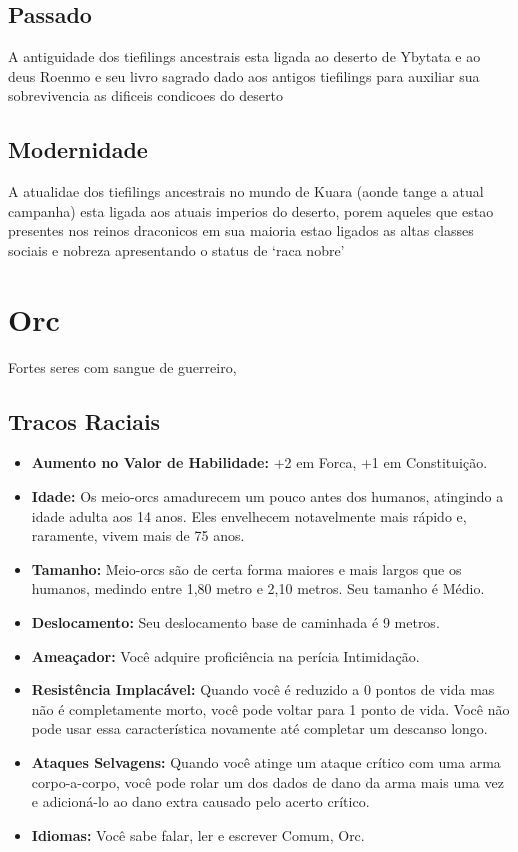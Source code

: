 \documentclass{book}
\begin{document}
\section{Passado}
A antiguidade dos tiefilings ancestrais esta ligada ao deserto de Ybytata e ao deus Roenmo 
e seu livro sagrado dado aos antigos tiefilings para auxiliar sua sobrevivencia as dificeis 
condicoes do deserto 
\section{Modernidade}
A atualidae dos tiefilings ancestrais no mundo de Kuara (aonde tange a atual campanha) esta 
ligada aos atuais imperios do deserto, porem aqueles que estao presentes nos reinos draconicos 
em sua maioria estao ligados as altas classes sociais e nobreza apresentando o status de `raca
nobre'

\chapter{Orc}
Fortes seres com sangue de guerreiro,
\section{Tracos Raciais}
\begin{itemize}
    \item \textbf{Aumento no Valor de Habilidade:} +2 em Forca, +1 em Constituição.
    \item \textbf{Idade:} Os meio-orcs amadurecem um pouco antes dos humanos, atingindo a 
         idade adulta aos 14 anos. Eles envelhecem notavelmente mais rápido e, raramente,
         vivem mais de 75 anos.
    \item \textbf{Tamanho:} Meio-orcs são de certa forma maiores e mais largos que os 
          humanos, medindo entre 1,80 metro e 2,10 metros. Seu tamanho é Médio.
    \item \textbf{Deslocamento:} Seu deslocamento base de caminhada é 9 metros.
    \item \textbf{Ameaçador:} Você adquire proficiência na perícia Intimidação.
    \item \textbf{Resistência Implacável:} Quando você é reduzido a 0 pontos de vida mas não 
         é completamente morto, você pode voltar para 1 ponto de vida. Você não pode usar essa
         característica novamente até completar um descanso longo.
     \item \textbf{Ataques Selvagens:} Quando você atinge um ataque crítico com uma arma 
         corpo-a-corpo, você pode rolar um dos dados de dano da arma mais uma vez e 
         adicioná-lo ao dano extra causado pelo acerto crítico.
     \item \textbf{Idiomas:} Você sabe falar, ler e escrever Comum, Orc.
\end{itemize}
\end{document}
